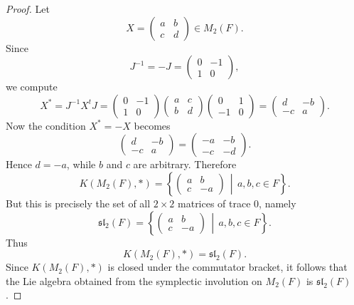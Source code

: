 \begin{proof}
    Let
    \[
        X=\begin{pmatrix}a&b\\ c&d\end{pmatrix}\in M_{2}(F).
    \]
    Since
    \[
        J^{-1}=-J=\begin{pmatrix}0&-1\\1&0\end{pmatrix},
    \]
    we compute
    \[
        X^{*}
        =J^{-1}X^{t}J
        =\begin{pmatrix}0&-1\\1&0\end{pmatrix}
        \begin{pmatrix}a&c\\ b&d\end{pmatrix}
        \begin{pmatrix}0&1\\-1&0\end{pmatrix}
        =\begin{pmatrix}d&-b\\-c&a\end{pmatrix}.
    \]
    Now the condition $X^{*}=-X$ becomes
    \[
        \begin{pmatrix}d&-b\\-c&a\end{pmatrix}
        =
        \begin{pmatrix}-a&-b\\-c&-d\end{pmatrix}.
    \]
    Hence $d=-a$, while $b$ and $c$ are arbitrary. Therefore
    \[
        K(M_{2}(F),*)
        =
        \left\{
        \begin{pmatrix}
            a & b  \\
            c & -a
        \end{pmatrix}
        \,\middle|\,
        a,b,c\in F
        \right\}.
    \]
    But this is precisely the set of all $2\times 2$ matrices of trace $0$, namely
    \[
        \mathfrak{sl}_{2}(F)
        =
        \left\{
        \begin{pmatrix}
            a & b  \\
            c & -a
        \end{pmatrix}
        \,\middle|\,
        a,b,c\in F
        \right\}.
    \]
    Thus
    \[
        K(M_{2}(F),*)=\mathfrak{sl}_{2}(F).
    \]
    Since $K(M_{2}(F),*)$ is closed under the commutator bracket, it follows that the Lie algebra obtained from the symplectic involution on $M_{2}(F)$ is $\mathfrak{sl}_{2}(F)$.
\end{proof}

